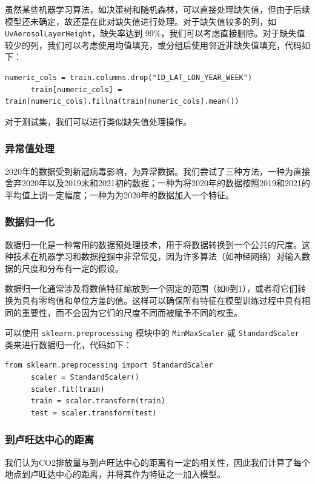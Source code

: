 \documentclass{ctexart}
\begin{document}
\begin{sloppypar}
虽然某些机器学习算法，如决策树和随机森林，可以直接处理缺失值，但由于后续模型还未确定，故还是在此对缺失值进行处理。对于缺失值较多的列，如 \texttt{UvAerosolLayerHeight}，缺失率达到 99\%，我们可以考虑直接删除。对于缺失值较少的列，我们可以考虑使用均值填充，或分组后使用邻近非缺失值填充，代码如下：

\begin{lstlisting}[style=Python]
      numeric_cols = train.columns.drop("ID_LAT_LON_YEAR_WEEK")
      train[numeric_cols] = train[numeric_cols].fillna(train[numeric_cols].mean())
\end{lstlisting}

对于测试集，我们可以进行类似缺失值处理操作。

\subsubsection{异常值处理}
2020年的数据受到新冠病毒影响，为异常数据。我们尝试了三种方法，一种为直接舍弃2020年以及2019末和2021初的数据；一种为将2020年的数据按照2019和2021的平均值上调一定幅度；一种为为2020年的数据加入一个特征。

\subsubsection{数据归一化}

数据归一化是一种常用的数据预处理技术，用于将数据转换到一个公共的尺度。这种技术在机器学习和数据挖掘中非常常见，因为许多算法（如神经网络）对输入数据的尺度和分布有一定的假设。

数据归一化通常涉及将数值特征缩放到一个固定的范围（如0到1），或者将它们转换为具有零均值和单位方差的值。这样可以确保所有特征在模型训练过程中具有相同的重要性，而不会因为它们的尺度不同而被赋予不同的权重。

可以使用 \texttt{sklearn.preprocessing} 模块中的 \texttt{MinMaxScaler} 或 \texttt{StandardScaler} 类来进行数据归一化，代码如下：

\begin{lstlisting}[style=Python]
      from sklearn.preprocessing import StandardScaler
      scaler = StandardScaler()
      scaler.fit(train)
      train = scaler.transform(train)
      test = scaler.transform(test)
\end{lstlisting}

\subsubsection{到卢旺达中心的距离}
我们认为CO2排放量与到卢旺达中心的距离有一定的相关性，因此我们计算了每个地点到卢旺达中心的距离，并将其作为特征之一加入模型。


\end{sloppypar}
\end{document}
